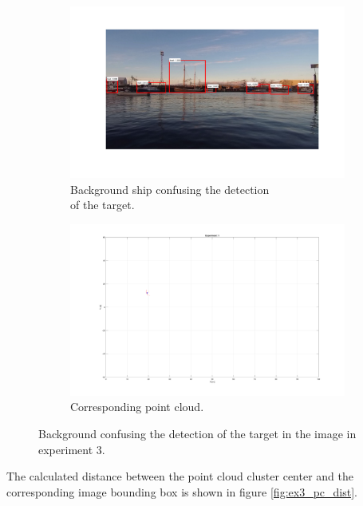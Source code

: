 \begin{figure}[H]
	\centering
	\begin{subfigure}[t]{.5\linewidth}
		\centering
		\includegraphics[width=\linewidth]{fig/ex3_miss.png}
		\caption{Background ship confusing the detection\\ of the target.}
		\label{fig:sub_ex3_issue}
	\end{subfigure}%
	\begin{subfigure}[t]{.5\linewidth}
		\centering
		\includegraphics[width=\linewidth]{fig/ex3_miss_pc.png}
		\caption{Corresponding point cloud.}
		\label{fig:sub_ex3_issue2}
	\end{subfigure}
	\caption{Background confusing the detection of the target in the image in experiment 3.}
	\label{fig:issues_ex3}
\end{figure}
The calculated distance between the point cloud cluster center and the corresponding image bounding box is shown in figure \ref{fig:ex3_pc_dist}.
